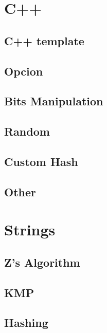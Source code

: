 \section{C++}
\subsection{C++ template}
\raggedbottom
\hrulefill
\subsection{Opcion}
\raggedbottom
\hrulefill
\subsection{Bits Manipulation}
\raggedbottom
\hrulefill
\subsection{Random}
\raggedbottom
\hrulefill
\subsection{Custom Hash}
\raggedbottom
\hrulefill
\subsection{Other}
\raggedbottom
\hrulefill

\section{Strings}
\subsection{Z's Algorithm}
\raggedbottom
\hrulefill
\subsection{KMP}
\raggedbottom
\hrulefill
\subsection{Hashing}
\raggedbottom
\hrulefill
